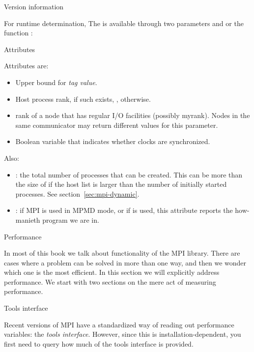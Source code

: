  {Version information}

For runtime determination,
The  is available through two parameters
 and 
or the function :
%

 {Attributes}
\label{sec:mpi_attr}


Attributes are:
\begin{itemize}
\item {}
  Upper bound for \emph{tag value}.
\item {}
  Host process rank, if such exists, , otherwise.
\item {}
rank of a node that has regular I/O facilities (possibly
myrank). Nodes in the same communicator may return different values
for this parameter.
\item {}
Boolean variable that indicates whether clocks are synchronized.
\end{itemize}

Also:
\begin{itemize}
\item {}: the total number of processes
  that can be created. This can be more than the size of
   if the host list is larger than the number of
  initially started processes. See section~\ref{sec:mpi-dynamic}.
\item {}: if MPI is used in \ac{MPMD} mode, or
  if  is used, this attribute
  reports the how-manieth program we are in.
\end{itemize}

 {Performance}
\label{sec:mpi-performance}

In most of this book we talk about functionality of the MPI
library. There are cases where a problem can be solved in more than
one way, and then we wonder which one is the most efficient. In this
section we will explicitly address performance. We start with two
sections on the mere act of measuring performance.

 {Tools interface}

Recent versions of MPI have a standardized way of reading out
performance variables: the \emph{tools interface}.
However, since this is installation-dependent,
you first need to query how much of the tools interface is provided.

